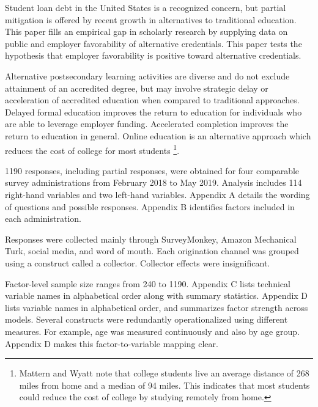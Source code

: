 \documentclass[review]{elsarticle}
\begin{document}
        Student loan debt in the United States is a recognized concern\cite{friedman2018student},
        but partial mitigation is offered by recent growth in alternatives to traditional education.
        This paper fills an empirical gap in scholarly research by supplying
        data on public and employer favorability of alternative credentials.
        This paper tests the hypothesis that employer favorability is positive toward alternative credentials.
        
        Alternative postsecondary learning activities are diverse and do not
        exclude attainment of an accredited degree, but may involve strategic
        delay or acceleration of accredited education when compared to traditional approaches.
        Delayed formal education improves the return to education for
        individuals who are able to leverage employer funding. Accelerated completion improves the return
        to education in general.
        Online education is an alternative approach which reduces the cost of college for most students
        \footnote{
            Mattern and Wyatt\cite{mattern2009student} note that college students live an average distance of
            268 miles from home and a median of 94 miles. This indicates that most students could reduce
            the cost of college by studying remotely from home.
        }.
        
        1190 responses, including partial responses, were obtained for four
        comparable survey administrations from February 2018 to May 2019.
        Analysis includes 114 right-hand variables and two left-hand variables.
        Appendix A details the wording of questions and possible responses.
        Appendix B identifies factors included in each administration.

        Responses were collected mainly through SurveyMonkey, Amazon Mechanical
        Turk, social media,
        and word of mouth. Each origination channel was grouped using a construct
        called a collector. Collector effects were insignificant.
        
        Factor-level sample size ranges from 240 to 1190. Appendix C lists
        technical variable names in alphabetical order along with summary
        statistics. Appendix D lists variable names in alphabetical order, and
        summarizes factor strength across models.
        Several constructs were redundantly
        operationalized using different measures. For example, age was measured
        continuously and also by age group. Appendix D makes this
        factor-to-variable mapping clear.
        
\end{document}
